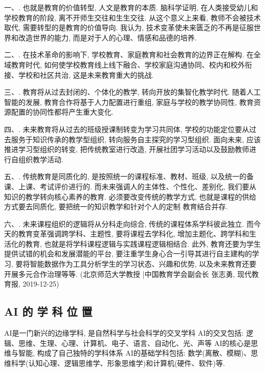 \textcolor[rgb]{0,0,1}{一}、. 也就是教育的价值转型, 人文是教育的本质. 脑科学证明, 在人类接受幼儿和学校教育的阶段, 离不开师生交往和生生交往. 从这个意义上来看, 教师不会被技术取代, 需要转型的是教育的价值导向. 我认为, 技术变革使未来匮乏的不再是征服世界和改造世界的能力, 而是对于人的心理、情感和品德的培养.

\textcolor[rgb]{0,0,1}{二}、. 在技术革命的影响下, 学校教育、家庭教育和社会教育的边界正在解构. 在全域教育时代, 如何使学校教育线上线下融合、学校家庭沟通协同、校内和校外衔接、学校和社区共治, 这是未来教育重大的挑战.

\textcolor[rgb]{0,0,1}{三}、. 教育将从过去封闭的、个体化的教学, 转向开放的集智化教学时代. 随着人工智能的发展, 教育合作将基于人力配置进行重组, 家庭与学校的教学协同性, 教育资源配置的协同性都将产生重大变化.

\textcolor[rgb]{0,0,1}{四}、. 未来教育将从过去的班级授课制转变为学习共同体, 学校的功能定位要从过去服务于知识传承的教学型组织, 转向服务自主探究的学习型组织. 面向未来, 应该推进学习型组织的转变, 把传统教室进行改造, 开展社团学习活动以及鼓励教师进行自组织教学活动.

\textcolor[rgb]{0,0,1}{五}、. 传统教育是同质化的, 是按照统一的课程标准、教材、班级, 以及统一的备课、上课、考试评价进行的. 而未来强调人的主体性、个性化、差别化, 我们要从知识的教学转向核心素养的教育. 必须要改变传统的教学方式, 也就是课程的供给方式要去同质化, 要把统一的知识教学和针对个人的定制
教育结合并存.

\textcolor[rgb]{0,0,1}{六}、. 未来课程组织的逻辑将从分科走向综合, 传统的课程体系学科彼此独立. 而今天的教育变革强调跨学科、主题性, 要将课程去学科化, 增加主题化、跨学科和生活化的教育, 也就是将学科课程逻辑与实践课程逻辑相结合.
此外, 教育还要为学生提供试错的机会和发展潜能的平台, 要注重学生身心合一引导其进行自主建构的学习, 要将智能数据作为工具分析学生的学习状态、兴趣和优势, 以及未来教育还要开展多元合作治理等等.
(北京师范大学教授 |中国教育学会副会长 张志勇, 现代教育报, 2019-12-25)
\subsection{AI 的 学 科 位 置}
AI是一门新兴的边缘学科, 是自然科学与社会科学的交叉学科
AI的交叉包括: 逻辑、思维、生理、心理、计算机、电子、语言、自动化、光、声等
AI的核心是思维与智能, 构成了自己独特的学科体系
AI的基础学科包括: 数学(离散、模糊)、思维科学(认知心理、逻辑思维学、形象思维学)和计算机(硬件、软件)等.

